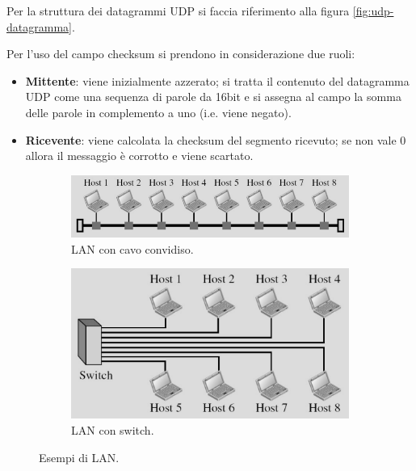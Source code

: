 \documentclass[11pt, italian, openany]{book}
\begin{document}
\begin{sloppypar}
\begin{itemize}[topsep=0pt, itemsep=0pt, parsep=0pt]
	Per la struttura dei datagrammi UDP si faccia riferimento alla figura \ref{fig:udp-datagramma}.

	Per l'uso del campo checksum si prendono in considerazione due ruoli:
	\begin{itemize}[topsep=0pt, itemsep=0pt]
		\item \textbf{Mittente}: viene inizialmente azzerato; si tratta il contenuto del datagramma UDP come una sequenza di parole da 16bit e si assegna al campo
		la somma delle parole in complemento a uno (i.e. viene negato).
		\item \textbf{Ricevente}: viene calcolata la checksum del segmento ricevuto; se non vale 0 allora il messaggio \`e corrotto e viene scartato.
	\end{itemize}
\end{itemize}

\pagebreak

\begin{figure}[h!]
	\begin{subfigure}[t]{0.49 \linewidth} \centering
		\includegraphics[scale=0.35]{images/lan-obsoleta.png}
		\caption{LAN con cavo convidiso.}
	\end{subfigure}
	\begin{subfigure}[t]{0.49 \linewidth} \centering
		\includegraphics[scale=0.4]{images/lan-moderna.png}
		\caption{LAN con switch.}
	\end{subfigure}
	\caption{Esempi di LAN.}
	\label{fig:LAN}
\end{figure}


\end{sloppypar}
\end{document}
